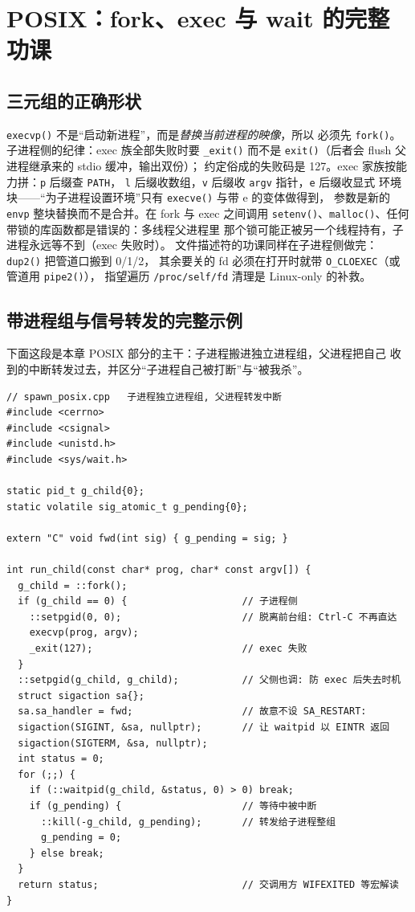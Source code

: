 \documentclass[12pt,a4paper,fontset=fandol]{ctexbook}
\newcommand{\Fn}[1]{\texttt{#1()}}
\newcommand{\Tp}[1]{\texttt{#1}}
\begin{document}
\section{POSIX：fork、exec 与 wait 的完整功课}

\subsection{三元组的正确形状}

\Fn{execvp} 不是``启动新进程''，而是\emph{替换当前进程的映像}，所以
必须先 \Fn{fork}。子进程侧的纪律：exec 族全部失败时要 \Fn{\_exit}
而不是 \Fn{exit}（后者会 flush 父进程继承来的 stdio 缓冲，输出双份）；
约定俗成的失败码是 127。exec 家族按能力拼：\Tp{p} 后缀查 \Tp{PATH}，
\Tp{l} 后缀收数组，\Tp{v} 后缀收 \Tp{argv} 指针，\Tp{e} 后缀收显式
环境块——``为子进程设置环境''只有 \Fn{execve} 与带 e 的变体做得到，
参数是新的 \Tp{envp} 整块替换而不是合并。在 fork 与 exec 之间调用
\Fn{setenv}、\Fn{malloc}、任何带锁的库函数都是错误的：多线程父进程里
那个锁可能正被另一个线程持有，子进程永远等不到（exec 失败时）。
文件描述符的功课同样在子进程侧做完：\Fn{dup2} 把管道口搬到 0/1/2，
其余要关的 fd 必须在打开时就带 \Tp{O\_CLOEXEC}（或管道用 \Fn{pipe2}），
指望遍历 \Tp{/proc/self/fd} 清理是 Linux-only 的补救。

\subsection{带进程组与信号转发的完整示例}

下面这段是本章 POSIX 部分的主干：子进程搬进独立进程组，父进程把自己
收到的中断转发过去，并区分``子进程自己被打断''与``被我杀''。

\begin{lstlisting}[caption={fork+exec、setpgid 与信号转发（spawn\_posix.cpp）}]
// spawn_posix.cpp   子进程独立进程组, 父进程转发中断
#include <cerrno>
#include <csignal>
#include <unistd.h>
#include <sys/wait.h>

static pid_t g_child{0};
static volatile sig_atomic_t g_pending{0};

extern "C" void fwd(int sig) { g_pending = sig; }

int run_child(const char* prog, char* const argv[]) {
  g_child = ::fork();
  if (g_child == 0) {                    // 子进程侧
    ::setpgid(0, 0);                     // 脱离前台组: Ctrl-C 不再直达
    execvp(prog, argv);
    _exit(127);                          // exec 失败
  }
  ::setpgid(g_child, g_child);           // 父侧也调: 防 exec 后失去时机
  struct sigaction sa{};
  sa.sa_handler = fwd;                   // 故意不设 SA_RESTART:
  sigaction(SIGINT, &sa, nullptr);       // 让 waitpid 以 EINTR 返回
  sigaction(SIGTERM, &sa, nullptr);
  int status = 0;
  for (;;) {
    if (::waitpid(g_child, &status, 0) > 0) break;
    if (g_pending) {                     // 等待中被中断
      ::kill(-g_child, g_pending);       // 转发给子进程整组
      g_pending = 0;
    } else break;
  }
  return status;                         // 交调用方 WIFEXITED 等宏解读
}
\end{lstlisting}
\end{document}
